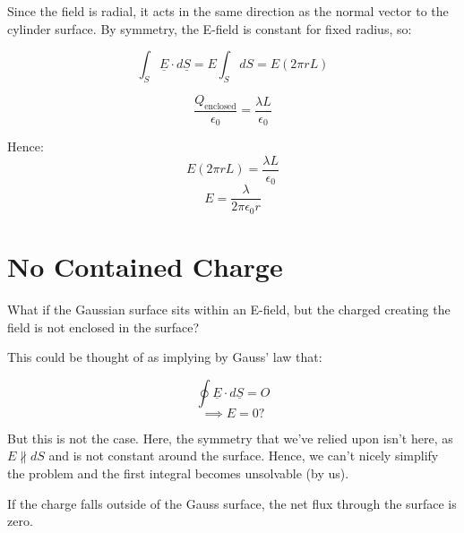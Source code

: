 Since the field is radial, it acts in the same direction as the normal vector to the cylinder surface. By symmetry, the E-field is constant for fixed radius, so:

\[
    \int_S \underline{E} \cdot d \underline{S} = E \int_S dS = E (2 \pi r L)
\]

\[
    \frac{Q_\text{enclosed}}{\epsilon_0} = \frac{\lambda L}{\epsilon_0}
\]

Hence:
\[
    E(2 \pi r L) = \frac{\lambda L}{\epsilon_0}
\]
\[
    E = \frac{\lambda}{2 \pi \epsilon_0 r}
\]

\section{No Contained Charge}

What if the Gaussian surface sits within an E-field, but the charged creating the field is not enclosed in the surface?

This could be thought of as implying by Gauss' law that:

\[
    \oint \underline{E} \cdot d \underline{S} = O
\]
\[
    \implies E = 0 ?
\]

But this is not the case. Here, the symmetry that we've relied upon isn't here, as $E \not\parallel dS$ and is not constant around the surface. Hence, we can't nicely simplify the problem and the first integral becomes unsolvable (by us).

If the charge falls outside of the Gauss surface, the net flux through the surface is zero.
